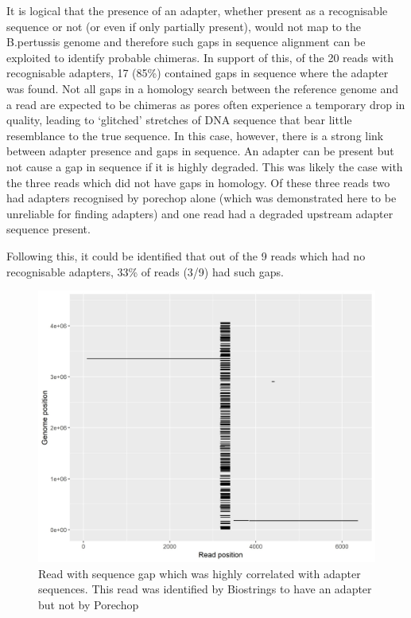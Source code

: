 It is logical that the presence of an adapter, whether present as a recognisable sequence or not (or even if only partially present), would not map to the B.pertussis genome and therefore such gaps in sequence alignment can be exploited to identify probable chimeras. In support of this, of the 20 reads with recognisable adapters, 17 (85\%) contained gaps in sequence where the adapter was found. Not all gaps in a homology search between the reference genome and a read are expected to be chimeras as pores often experience a temporary drop in quality, leading to `glitched' stretches of DNA sequence that bear little resemblance to the true sequence. In this case, however, there is a strong link between adapter presence and gaps in sequence. An adapter can be present but not cause a gap in sequence if it is highly degraded. This was likely the case with the three reads which did not have gaps in homology. Of these three reads two had adapters recognised by porechop alone (which was demonstrated here to be unreliable for finding adapters) and one read had a degraded upstream adapter sequence present.


 Following this, it could be identified that out of the 9 reads which had no recognisable adapters, 33\%  of reads (3/9) had such gaps. 

\begin{figure}[h!]
\centering
\includegraphics[width=\textwidth{}]{Chapter_2/Blast_results_347395.jpeg}
\caption{ Read with sequence gap which was highly correlated with adapter sequences. This read was identified by Biostrings to have an adapter but not by Porechop}
\label{fig:UK54_new_basket}
\end{figure}



